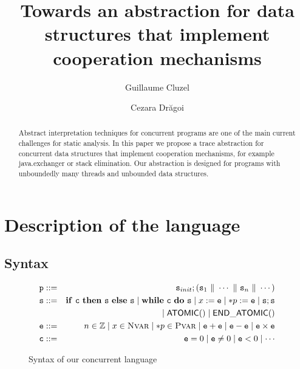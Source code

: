 \documentclass[runningheads]{llncs}
\newcommand\prule{\mathtt{p}}
\newcommand\srule{\mathtt{s}}
\newcommand{\erule}{\mathtt{e}}
\newcommand{\crule}{\mathtt{c}}
\newcommand{\ifinst}{\mathbf{if}}
\newcommand{\theninst}{\mathbf{then}}
\newcommand{\elseinst}{\mathbf{else}}
\newcommand{\whileinst}{\mathbf{while}}
\newcommand{\doinst}{\mathbf{do}}
\newcommand{\atomicbegin}{\mathsf{ATOMIC()}}
\newcommand{\atomicend}{\mathsf{END\_ATOMIC()}}
\newcommand{\Integer}{\mathbb Z}
\newcommand{\parallelcomposition}{\Vert}
\begin{document}
\title{Towards an abstraction for data structures that implement cooperation mechanisms}
%
%
\author{Guillaume Cluzel \and
Cezara Dr\u{a}goi}
%
%
%
\maketitle              %
%
\begin{abstract}

Abstract interpretation techniques for concurrent programs are one of the main current challenges for static analysis. 
In this paper we propose a trace abstraction for concurrent data structures that implement cooperation mechanisms, for example java.exchanger or stack elimination. 
Our abstraction is designed for programs with unboundedly many threads and unbounded data structures. 

\end{abstract}








  
   


  
  
  \section{Description of the language}
  \label{sec:syntax}
 
  \subsection{Syntax}
  
    \begin{figure}
    \begin{eqnarray*}
      \prule & ::= & \srule_{init} ; (\srule_1 \ \parallelcomposition \ \cdots \ \parallelcomposition \ \srule_n \ \parallelcomposition \ \cdots)\\
      \srule & ::= & \ifinst\ \crule\ \theninst \ {\srule} \ \elseinst \ {\srule} \mid 
      				\whileinst \ \crule \ \doinst \ {\srule} \mid 
      				x := \erule \mid *p := \erule \mid
      				\srule ; \srule \\
      				& & \mid \atomicbegin \mid \atomicend \\
      \erule & ::= & n \in \Integer \mid x \in \nvars \mid *p \in \pvars \mid
      			  \erule + \erule \mid \erule - \erule \mid \erule \times \erule \\
      \crule & ::= & \erule = 0 \mid \erule \neq 0 \mid \erule < 0 \mid \cdots
    \end{eqnarray*}
    \caption{Syntax of our concurrent language}
    \label{fig:syntax}
  \end{figure}
 
\end{document}

